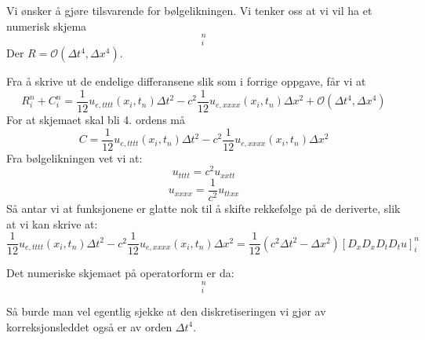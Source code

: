 \documentclass[a4paper, 10pt]{article}
\newcommand{\mc}{\mathcal}
\begin{document}
Vi ønsker å gjøre tilsvarende for bølgelikningen. Vi tenker oss at vi vil ha et numerisk skjema 
\begin{equation}
	[D_t D_t u_e = c^2 D_xD_x u_e + C + R]^n_i
\end{equation}
Der $R = \mc{O}(\Delta t^4, \Delta x^4)$.

Fra å skrive ut de endelige differansene slik som i forrige oppgave, får vi at
\begin{equation}
	R^n_i + C^n_i = \frac{1}{12} u_{e, tttt}(x_i, t_n)\Delta t^2 - c^2\frac{1}{12} u_{e, xxxx} (x_i, t_n)\Delta x^2 + \mc{O}(\Delta t^4, \Delta x^4)
\end{equation}
For at skjemaet skal bli 4. ordens må
\begin{equation}
	C = \frac{1}{12} u_{e, tttt}(x_i, t_n)\Delta t^2 - c^2\frac{1}{12} u_{e, xxxx} (x_i, t_n)\Delta x^2
\end{equation}
Fra bølgelikningen vet vi at:
\begin{equation}
	u_{tttt} = c^2u_{xxtt}
\end{equation}
\begin{equation}
	u_{xxxx} = \frac{1}{c^2} u_{ttxx}
\end{equation}
Så antar vi at funksjonene er glatte nok til å skifte rekkefølge på de deriverte, slik at vi kan skrive at:
\begin{equation}
	\frac{1}{12} u_{e, tttt}(x_i, t_n)\Delta t^2 - c^2\frac{1}{12} u_{e, xxxx} (x_i, t_n)\Delta x^2 = \frac{1}{12} (c^2\Delta t^2 - \Delta x^2)[D_xD_xD_tD_tu]_i^n
\end{equation}

Det numeriske skjemaet på operatorform er da:
\begin{equation}
	[D_tD_tu = c^2 D_xD_x u + \frac{1}{12} (c^2\Delta t - \Delta x^2) D_xD_xD_tD_tu)]_i^n
\end{equation}

Så burde man vel egentlig sjekke at den diskretiseringen vi gjør av korreksjonsleddet også er av orden $\Delta t^4$.
\end{document}
